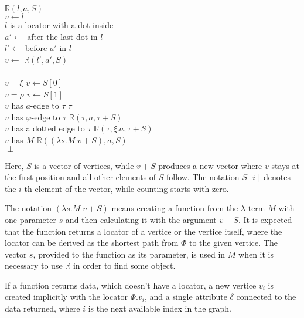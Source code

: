 \begin{twocols}
\begin{algo}
 $\mathbb{R}(l,a,S)$ \\
  \tab $v \gets l$ \\
  \tab {} $l$ is a locator with a dot inside \\
  \tab\tab $a' \gets$ after the last dot in $l$ \\
  \tab\tab $l' \gets$ before $a'$ in $l$ \\
  \tab\tab $v \gets$ $\mathbb{R}(l', a', S)$ \\
  \tab {} \\
  \tab {} $v = \xi$  $v \gets S[0]$ \\
  \tab {} $v = \rho$  $v \gets S[1]$ \\
  \tab {} $v$ has $a$-edge to $\tau$   $\tau$ \\
  \tab {} $v$ has $\varphi$-edge to $\tau$   $\mathbb{R}(\tau, a, \tau + S)$ \\
  \tab {} $v$ has a dotted edge to $\tau$   $\mathbb{R}(\tau, \xi.a, \tau + S)$ \\
  \tab {} $v$ has $M$   $\mathbb{R}((\lambda s.M \; v + S), a, S)$ \\
  \tab {} $\perp$ \\
\end{algo}
\end{twocols}

Here, $S$ is a vector of vertices, while $v+S$ produces a new vector
where $v$ stays at the first position and all other elements of $S$ follow.
The notation $S[i]$ denotes the $i$-th element of the vector, while
counting starts with zero.

The notation $(\lambda s.M \; v + S)$ means creating a function from
the $\lambda$-term $M$ with one parameter $s$ and then calculating
it with the argument $v + S$.
It is expected that the function returns a locator of a vertice or
the vertice itself, where the locator can be derived as
the shortest path from $\Phi$ to the given vertice.
The vector $s$, provided to the
function as its parameter, is used in $M$ when it is necessary
to use $\mathbb{R}$ in order to find some object.

If a function returns data, which doesn't have a locator, a new vertice
$v_i$ is created implicitly with the locator $\Phi.v_i$, and
a single attribute $\delta$ connected to the data returned, where
$i$ is the next available index in the graph.

